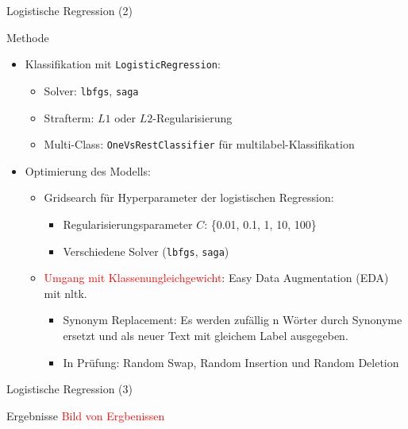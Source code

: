 \documentclass[aspectratio=169]{beamer} %
\begin{document}
\begin{frame}{Logistische Regression (2)}
    \begin{block}{Methode}
        \begin{itemize}
            \item Klassifikation mit \texttt{LogisticRegression}:
                  \begin{itemize}
                      \item Solver: \texttt{lbfgs}, \texttt{saga}
                      \item Strafterm: \(L1\) oder \(L2\)-Regularisierung
                      \item Multi-Class: \texttt{OneVsRestClassifier} f\"ur multilabel-Klassifikation
                  \end{itemize}
            \item Optimierung des Modells:
                  \begin{itemize}
                      \item Gridsearch f\"ur Hyperparameter der logistischen Regression:
                            \begin{itemize}
                                \item Regularisierungsparameter \(C\): \{0.01, 0.1, 1, 10, 100\}
                                \item Verschiedene Solver (\texttt{lbfgs}, \texttt{saga})
                            \end{itemize}
                      \item \textcolor{red}{Umgang mit Klassenungleichgewicht}: Easy Data Augmentation (EDA) mit nltk.
                            \begin{itemize}
                                \item Synonym Replacement: Es werden zuf\"allig n W\"orter durch Synonyme ersetzt und als neuer Text mit gleichem Label ausgegeben.
                                \item In Pr\"ufung: Random Swap, Random Insertion und Random Deletion
                            \end{itemize}
                  \end{itemize}
        \end{itemize}
    \end{block}
\end{frame}

\begin{frame}{Logistische Regression (3)}
    \begin{block}{Ergebnisse}
        \textcolor{red}{Bild von Ergbenissen}
    \end{block}
\end{frame}
\end{document}
